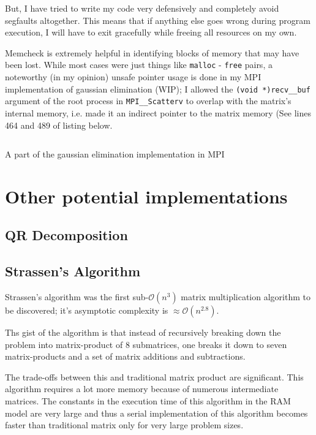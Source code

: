 \documentclass[a4paper]{article}
\newenvironment{code}{\captionsetup{type=listing}}{}
\begin{document}
But, I have tried to write my code very defensively and
completely avoid segfaults altogether. This
means that if anything else goes wrong during program execution,
I will have to exit gracefully while freeing all resources
on my own.

Memcheck is extremely helpful in identifying blocks of memory
that may have been lost. While most cases were just things like
\texttt{malloc} - \texttt{free} pairs, a noteworthy (in my opinion)
unsafe pointer usage is done in my MPI implementation of gaussian
elimination (WIP); I allowed the \texttt{(void *)recv\_\_buf}
argument of the root process in \texttt{MPI\_\_Scatterv} to
overlap with the matrix's internal memory, i.e. made it an
indirect pointer to the matrix memory (See lines 464 and 489
of listing below.

\begin{code}
\inputminted[samepage=false, breaklines, linenos, firstline=461, lastline=496]{c}{../src/impl_mpi.c}
\label{lst:mpi_gauss}
\caption{A part of the gaussian elimination implementation in MPI}
\end{code}


\section*{Other potential implementations}
\subsection*{QR Decomposition}


\subsection*{Strassen's Algorithm}
Strassen's algorithm was the first sub-$\mathcal{O}(n^3)$ matrix
multiplication algorithm to be discovered; it's asymptotic
complexity is $\approx\mathcal{O}(n^{2.8})$.

Ths gist of the algorithm is that instead of recursively
breaking down the problem into matrix-product of 8 submatrices,
one breaks it down to seven matrix-products and a set of
matrix additions and subtractions. 

The trade-offs between this and traditional matrix product are
significant. This algorithm requires a lot more memory because
of numerous intermediate matrices.
The constants in the execution time of this algorithm in the
RAM model are very large and thus a serial implementation of
this algorithm becomes faster than traditional matrix only
for very large problem sizes.
\end{document}
